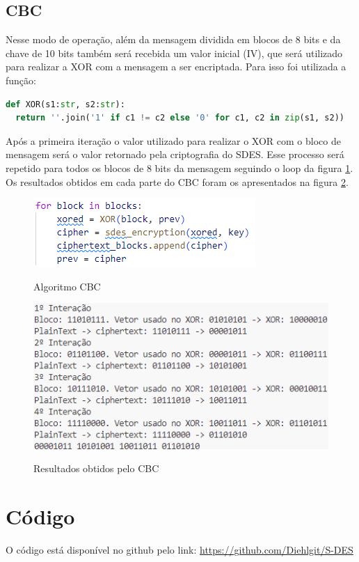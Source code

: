 \documentclass[12pt]{article}
\begin{document}
\subsection{CBC}
Nesse modo de operação, além da mensagem dividida em blocos de 8 bits e da chave de 10 bits também será recebida um valor inicial (IV), que será utilizado para realizar a XOR com a mensagem a ser encriptada. Para isso foi utilizada a função:

\begin{lstlisting}[language=Python]
def XOR(s1:str, s2:str):
  return ''.join('1' if c1 != c2 else '0' for c1, c2 in zip(s1, s2))
\end{lstlisting}

Após a primeira iteração o valor utilizado para realizar o XOR com o bloco de mensagem será o valor retornado pela criptografia do SDES. Esse processo será repetido para todos os blocos de 8 bits da mensagem seguindo o loop da figura \ref{fig:CBC}. Os resultados obtidos em cada parte do CBC foram os apresentados na figura \ref{fig:CBC_Results}.

\begin{figure}[h]
    \caption{Algoritmo CBC}
    \centering
    \includegraphics[width = 0.6\linewidth]{Imagens/CBC.png}  
    \label{fig:CBC}
\end{figure}

\begin{figure}[h]
    \caption{Resultados obtidos pelo CBC}
    \centering
    \includegraphics[width = 0.6\linewidth]{Imagens/CBC_Result.png}  
    \label{fig:CBC_Results}
\end{figure}

\section{Código}
O código está disponível no github pelo link: \href{https://github.com/Diehlgit/S-DES}{https://github.com/Diehlgit/S-DES}
\end{document}
